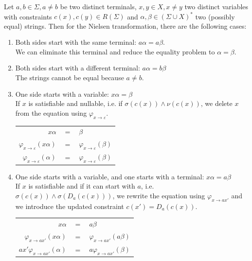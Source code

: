 Let $a, b \in \Sigma, a \neq b$ be two distinct terminals, $x, y \in X, x \neq y$ two distinct variables with constraints $c(x), c(y) \in R(\Sigma)$ and $\alpha, \beta \in (\Sigma \cup X)^*$ two (possibly equal) strings. Then for the Nielsen transformation, there are the following cases:

\begin{enumerate}
    \item \label{rnt_aa}
        Both sides start with the same terminal: $a\alpha = a\beta$. \\
        We can eliminate this terminal and reduce the equality problem to $\alpha =\beta$.
    
    \item \label{rnt_ab}
        Both sides start with a different terminal: $a\alpha = b\beta$ \\
        The strings cannot be equal because $a \neq b$.

    \item \label{rnt_xe}
        One side starts with a variable: $x\alpha = \beta$ \\
        If $x$ is satisfiable and nullable, i.e. if $\sigma(c(x)) \land \nu(c(x))$, we delete $x$ from the equation using $\varphi_{x \rightarrow \varepsilon}$.
        
        \begin{center}
        \begin{tabular}{r c l}
            $x\alpha$ & $=$ & $\beta$ \\    
            $\varphi_{x \rightarrow \varepsilon}(x\alpha)$ & $=$ & $\varphi_{x \rightarrow \varepsilon}(\beta)$ \\
            $\varphi_{x \rightarrow \varepsilon}(\alpha)$ & $=$ & $\varphi_{x \rightarrow \varepsilon}(\beta)$
        \end{tabular}
        \end{center}

    \item \label{rnt_xa}
        One side starts with a variable, and one starts with a terminal: $x\alpha = a\beta$\\
        If $x$ is satisfiable and if it can start with $a$, i.e. $\sigma(c(x)) \land \sigma(D_a(c(x)))$, we rewrite the equation using $\varphi_{x \rightarrow ax'}$ and we introduce the updated constraint $c(x') = D_a(c(x))$.
        
        \begin{center}
        \begin{tabular}{r c l}
            $x\alpha$ & $=$ & $a\beta$ \\
            $\varphi_{x \rightarrow ax'}(x\alpha)$ & $=$ & $\varphi_{x \rightarrow ax'}(a\beta)$ \\
            $ax'\varphi_{x \rightarrow ax'}(\alpha)$ & $=$ & $a\varphi_{x \rightarrow ax'}(\beta)$ \\
        \end{tabular}
        \end{center}


\end{enumerate}
